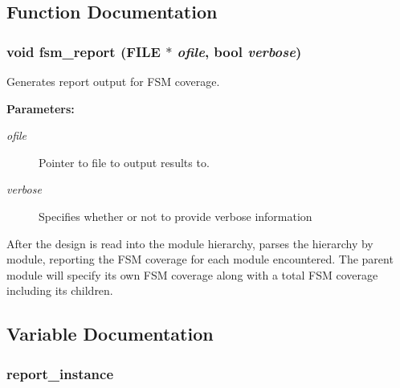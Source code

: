 \subsection{Function Documentation}
\subsubsection{\setlength{\rightskip}{0pt plus 5cm}void fsm\_\-report (FILE $\ast$ {\em ofile}, {\bf bool} {\em verbose})}\label{fsm_8c_a1}


Generates report output for FSM coverage.

\begin{Desc}
\item[{\bf Parameters: }]\par
\begin{description}
\item[
{\em ofile}]Pointer to file to output results to. \item[
{\em verbose}]Specifies whether or not to provide verbose information

\end{description}
\end{Desc}
After the design is read into the module hierarchy, parses the hierarchy by module, reporting the FSM coverage for each module encountered. The parent module will specify its own FSM coverage along with a total FSM coverage including its  children. 

\subsection{Variable Documentation}
\subsubsection{ report\_\-instance}\label{fsm_8c_a0}


